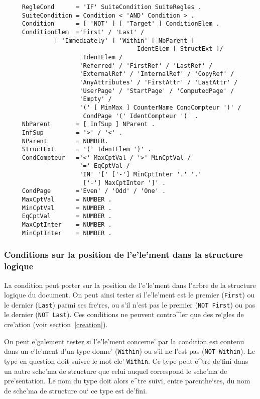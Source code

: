 {\begin{verbatim}
     RegleCond      = 'IF' SuiteCondition SuiteRegles .
     SuiteCondition = Condition < 'AND' Condition > .
     Condition      = [ 'NOT' ] [ 'Target' ] ConditionElem .
     ConditionElem  ='First' / 'Last' /
		      [ 'Immediately' ] 'Within' [ NbParent ]
                                     IdentElem [ StructExt ]/
                      IdentElem /
                     'Referred' / 'FirstRef' / 'LastRef' /
                     'ExternalRef' / 'InternalRef' / 'CopyRef' /
                     'AnyAttributes' / 'FirstAttr' / 'LastAttr' /
                     'UserPage' / 'StartPage' / 'ComputedPage' /
                     'Empty' /
                     '(' [ MinMax ] CounterName CondCompteur ')' /
                      CondPage '(' IdentCompteur ')' .
     NbParent       = [ InfSup ] NParent .
     InfSup         = '>' / '<' .
     NParent        = NUMBER.
     StructExt      = '(' IdentElem ')' .
     CondCompteur   ='<' MaxCptVal / '>' MinCptVal /
                     '=' EqCptVal / 
                     'IN' '[' ['-'] MinCptInter '.' '.'
                      ['-'] MaxCptInter ']' .
     CondPage       ='Even' / 'Odd' / 'One' .
     MaxCptVal      = NUMBER .
     MinCptVal      = NUMBER .
     EqCptVal       = NUMBER .
     MaxCptInter    = NUMBER .
     MinCptInter    = NUMBER .
\end{verbatim}

\subsubsection{Conditions sur la position de l'e'le'ment dans la structure
logique}

La condition peut porter sur la position de l'e'le'ment dans l'arbre de la
structure logique du document. On peut ainsi tester si l'e'le'ment est le
premier ({\tt First}) ou le dernier ({\tt Last}) parmi ses fre`res, ou s'il
n'est pas le premier ({\tt NOT First}) ou pas le dernier ({\tt NOT Last}).
Ces conditions ne peuvent contro^ler que des re`gles de cre'ation
(voir section~\ref{creation}).

On peut e'galement tester si l'e'le'ment concerne' par la condition est
contenu dans un e'le'ment d'un type donne' ({\tt Within}) ou s'il ne l'est
pas ({\tt NOT Within}). Le type en question doit suivre le mot cle'
{\tt Within}. Ce type peut e^tre de'fini dans un autre sche'ma de structure
que celui auquel correspond le sche'ma de pre'sentation. Le nom du type
doit alors e^tre suivi, entre parenthe`ses, du nom de sche'ma de structure
ou` ce type est de'fini.

}
